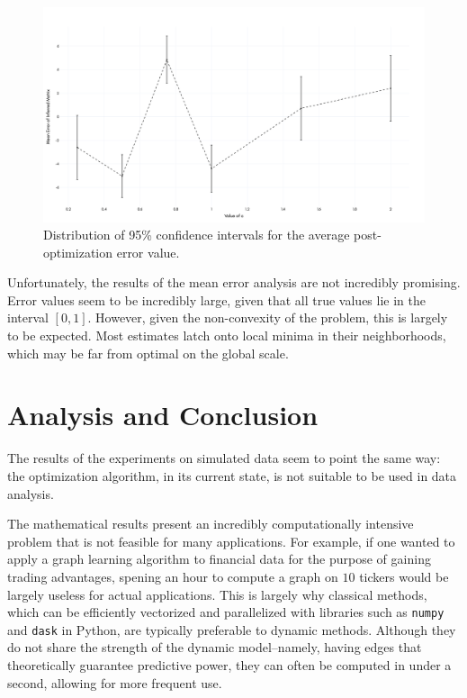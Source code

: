 \documentclass[12pt]{article}
\theoremstyle{definition}
\begin{document}
\begin{figure}[hbt!]
    \par
    \begin{center}
    \caption{Distribution of 95\% confidence intervals for the average post-optimization error value.}
    \label{fig:erroBarOptimError}
    \includegraphics[scale=0.12]{Figures/error_bars_optim.png}
    \end{center}
    \par
    \vspace{-0.25in}
    \medskip
\end{figure}

Unfortunately, the results of the mean error analysis are not incredibly promising. Error values seem to be incredibly large, given that all true values lie in the interval $[0, 1]$. However, given the non-convexity of the problem, this is largely to be expected. Most estimates latch onto local minima in their neighborhoods, which may be far from optimal on the global scale.

\section{Analysis and Conclusion}

The results of the experiments on simulated data seem to point the same way: the optimization algorithm, in its current state, is not suitable to be used in data analysis. 

The mathematical results present an incredibly computationally intensive problem that is not feasible for many applications. For example, if one wanted to apply a graph learning algorithm to financial data for the purpose of gaining trading advantages, spening an hour to compute a graph on $10$ tickers would be largely useless for actual applications. This is largely why classical methods, which can be efficiently vectorized and parallelized with libraries such as \texttt{numpy} and \texttt{dask} in Python, are typically preferable to dynamic methods. Although they do not share the strength of the dynamic model--namely, having edges that theoretically guarantee predictive power, they can often be computed in under a second, allowing for more frequent use.
\end{document}
